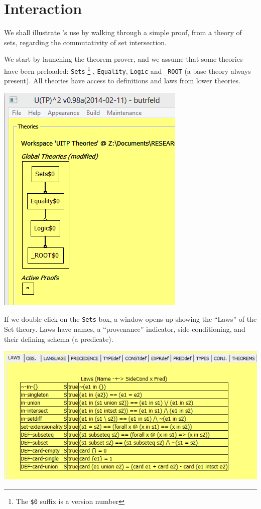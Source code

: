 \section{Interaction}\label{sec:interact}

We shall illustrate 's use by walking through a simple proof,
from a theory of sets, regarding the commutativity of set intersection.

\noindent
We start by launching the theorem prover, and we assume that some theories have been
preloaded: \texttt{Sets}%
\footnote{The \texttt{\$0} suffix is a version number}%
, \texttt{Equality}, \texttt{Logic} and \texttt{\_ROOT} (a base theory always present).
All theories have access to definitions and laws from lower theories.


\includegraphics[scale=0.5]{01-initial-state.png}

\noindent
If we double-click on the \texttt{Sets} box,
a window opens up showing the ``Laws'' of the Set theory.
Laws have names, a ``provenance'' indicator, side-conditioning,
and their defining schema (a predicate).

\includegraphics[scale=0.5]{02-set-axioms.png}

